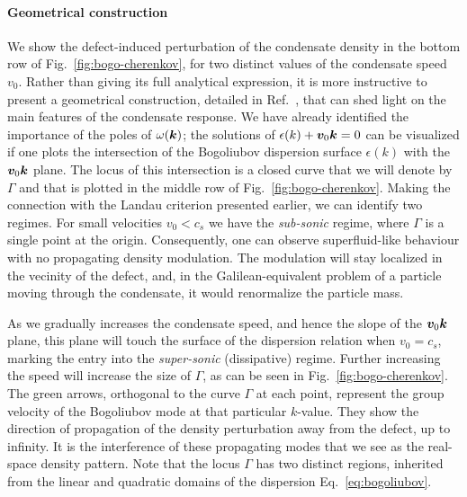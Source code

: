\paragraph{Geometrical construction}
We show the defect-induced perturbation of the condensate density in
the bottom row of Fig.~\ref{fig:bogo-cherenkov}, for two distinct
values of the condensate speed $v_0$. Rather than giving its full
analytical expression, it is more instructive to present a geometrical
construction, detailed in Ref.~\cite{9783319002651}, that can shed
light on the main features of the condensate response.  We have
already identified the importance of the poles of $\omega(\bm{k})$; the
solutions of $\epsilon(k) + \bm{v}_0 \bm{k} = 0$ can be visualized if one
plots the intersection of the Bogoliubov dispersion surface
$\epsilon(k)$ with the $\bm{v}_0 \bm{k}$ plane. The locus of this
intersection is a closed curve that we will denote by $\Gamma$ and
that is plotted in the middle row of
Fig.~\ref{fig:bogo-cherenkov}. Making the connection with the Landau
criterion presented earlier, we can identify two regimes.  For small
velocities $v_0 < c_s$ we have the \textit{sub-sonic} regime, where
$\Gamma$ is a single point at the origin. Consequently, one can
observe superfluid-like behaviour with no propagating density
modulation. The modulation will stay localized in the vecinity of the
defect, and, in the Galilean-equivalent problem of a particle moving
through the condensate, it would renormalize the particle
mass.~\cite{Astrakharchik_2004}

As we gradually increases the condensate speed, and hence the slope of
the $\bm{v}_0 \bm{k}$ plane, this plane will touch the surface of the
dispersion relation when $v_0 = c_s$, marking the entry into the
\textit{super-sonic} (dissipative) regime. Further increasing the
speed will increase the size of $\Gamma$, as can be seen in
Fig.~\ref{fig:bogo-cherenkov}. The green arrows, orthogonal to the
curve $\Gamma$ at each point, represent the group velocity of the
Bogoliubov mode at that particular $k$-value. They show the direction
of propagation of the density perturbation away from the defect, up to
infinity. It is the interference of these propagating modes that we
see as the real-space density pattern. Note that the locus $\Gamma$
has two distinct regions, inherited from the linear and quadratic
domains of the dispersion Eq.~\eqref{eq:bogoliubov}.

